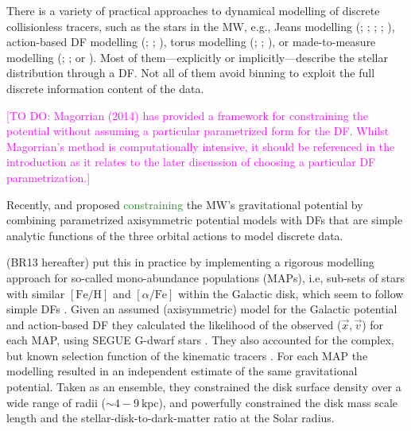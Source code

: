 \documentclass[iop,revtex4]{emulateapj}
\newcommand{\MAP}{MAP}
\newcommand{\MAPs}{MAPs}
\newcommand{\NEW}[1]{\textcolor{ForestGreen}{#1}}
\newcommand{\Wilma}[1]{\textcolor{Magenta}{#1}}
\newcommand{\OLD}[1]{}
\begin{document}
There is a variety of practical approaches to dynamical modelling of discrete collisionless tracers, such as the stars in the MW, e.g., Jeans modelling (\citealt{1989MNRAS.239..605K}; \citealt{2012ApJ...756...89B}; \citealt{2012MNRAS.425.1445G}; \citealt{2013ApJ...772..108Z}; \citealt{2015MNRAS.452..956B}), action-based DF modelling (\citealt{2013ApJ...779..115B}; \citealt{2014MNRAS.445.3133P}; \citealt{2015MNRAS.449.3479S}), torus modelling (\citealt{2008MNRAS.390..429M}; \citealt{2012MNRAS.419.2251M}; \citealt{2013MNRAS.433.1411M}), or made-to-measure modelling (\citealt{1996MNRAS.282..223S}; \citealt{2007MNRAS.376...71D}; or \citealt{2014MNRAS.443.2112H}). Most of them---explicitly or implicitly---describe the stellar distribution through a DF. Not all of them avoid binning to exploit the full discrete information content of the data.

\Wilma{[TO DO: Magorrian (2014) has provided a framework for constraining the potential without assuming a particular parametrized form for the DF. Whilst Magorrian's method is computationally intensive, it should be referenced in the introduction as it relates to the later discussion of choosing a particular DF parametrization.]}

Recently, \citet{2012MNRAS.426.1328B} and \citet{2013ApJ...779..115B} proposed \OLD{to constrain}\NEW{constraining} the MW's gravitational potential by combining parametrized axisymmetric potential models with DFs that are simple analytic functions of the three orbital actions to model discrete data.

\citet{2013ApJ...779..115B} (BR13 hereafter) put this in practice by implementing a rigorous modelling approach for so-called mono-abundance populations (\MAPs{}), i.e, sub-sets of stars with similar $[\mathrm{Fe}/\mathrm{H}]$ and $[\alpha/\mathrm{Fe}]$ within the Galactic disk, which seem to follow simple DFs \citep{2012ApJ...751..131B,2012ApJ...755..115B,2012ApJ...753..148B}. Given an assumed (axisymmetric) model for the Galactic potential and action-based DF \citep{2010MNRAS.401.2318B,2011MNRAS.413.1889B,2013MNRAS.434..652T} they calculated the likelihood of the observed ($\vec{x},\vec{v}$) for each \MAP{}, using SEGUE G-dwarf stars \citep{2009AJ....137.4377Y}. They also accounted for the complex, but known selection function of the kinematic tracers \citep{2012ApJ...753..148B}. For each \MAP{} the modelling resulted in an independent estimate of the same gravitational potential. Taken as an ensemble, they constrained the disk surface density over a wide range of radii ($\sim 4-9~\text{kpc}$), and powerfully constrained the disk mass scale length and the stellar-disk-to-dark-matter ratio at the Solar radius. 
\end{document}

